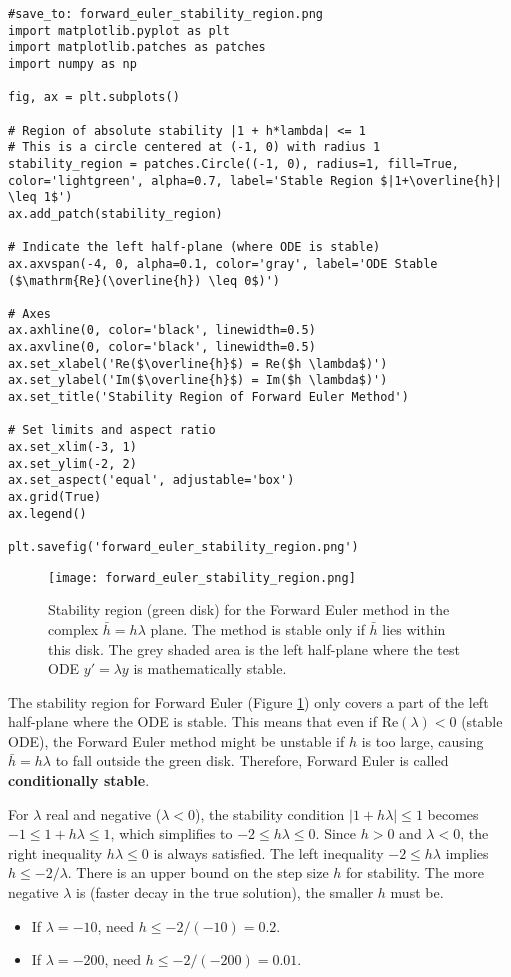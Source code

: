 \documentclass{article}
\begin{document}
\begin{verbatim}
#save_to: forward_euler_stability_region.png
import matplotlib.pyplot as plt
import matplotlib.patches as patches
import numpy as np

fig, ax = plt.subplots()

# Region of absolute stability |1 + h*lambda| <= 1
# This is a circle centered at (-1, 0) with radius 1
stability_region = patches.Circle((-1, 0), radius=1, fill=True, color='lightgreen', alpha=0.7, label='Stable Region $|1+\overline{h}| \leq 1$')
ax.add_patch(stability_region)

# Indicate the left half-plane (where ODE is stable)
ax.axvspan(-4, 0, alpha=0.1, color='gray', label='ODE Stable ($\mathrm{Re}(\overline{h}) \leq 0$)')

# Axes
ax.axhline(0, color='black', linewidth=0.5)
ax.axvline(0, color='black', linewidth=0.5)
ax.set_xlabel('Re($\overline{h}$) = Re($h \lambda$)')
ax.set_ylabel('Im($\overline{h}$) = Im($h \lambda$)')
ax.set_title('Stability Region of Forward Euler Method')

# Set limits and aspect ratio
ax.set_xlim(-3, 1)
ax.set_ylim(-2, 2)
ax.set_aspect('equal', adjustable='box')
ax.grid(True)
ax.legend()

plt.savefig('forward_euler_stability_region.png')
\end{verbatim}

\begin{figure}[h]
    \centering
    \texttt{[image: forward\_euler\_stability\_region.png]}
    \caption{Stability region (green disk) for the Forward Euler method in the complex $\bar{h} = h\lambda$ plane. The method is stable only if $\bar{h}$ lies within this disk. The grey shaded area is the left half-plane where the test ODE $y'=\lambda y$ is mathematically stable.}
    \label{fig:forward_euler_stability}
\end{figure}

The stability region for Forward Euler (Figure \ref{fig:forward_euler_stability}) only covers a part of the left half-plane where the ODE is stable. This means that even if $\text{Re}(\lambda) < 0$ (stable ODE), the Forward Euler method might be unstable if $h$ is too large, causing $\bar{h}=h\lambda$ to fall outside the green disk.
Therefore, Forward Euler is called \textbf{conditionally stable}.

For $\lambda$ real and negative ($\lambda < 0$), the stability condition $|1+h\lambda| \le 1$ becomes $-1 \le 1+h\lambda \le 1$, which simplifies to $-2 \le h\lambda \le 0$. Since $h>0$ and $\lambda<0$, the right inequality $h\lambda \le 0$ is always satisfied. The left inequality $-2 \le h\lambda$ implies $h \le -2/\lambda$. There is an upper bound on the step size $h$ for stability.
The more negative $\lambda$ is (faster decay in the true solution), the smaller $h$ must be.
\begin{itemize}
    \item If $\lambda = -10$, need $h \le -2/(-10) = 0.2$.
    \item If $\lambda = -200$, need $h \le -2/(-200) = 0.01$.
\end{itemize}
\end{document}
